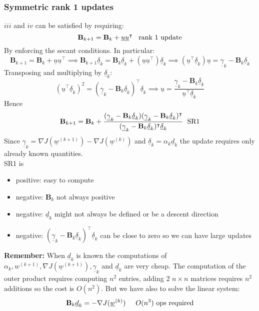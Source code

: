 \subsubsection{Symmetric rank 1 updates}
$iii$ and $iv$ can be satisfied by requiring:
\[
    \mathbf{B}_{k+1} = \mathbf{B}_k + \underline{u}\underline{u}^\intercal \hspace{0.3cm} \text{rank 1 update}   
\]
By enforcing the secant conditions. In particular:
\[
    \mathbf{B}_{k+1} = \mathbf{B}_k + \underline{u}\underline{u}^\intercal \implies \mathbf{B}_{k+1} \underline{\delta}_k = \mathbf{B}_k \underline{\delta}_k + (\underline{u}\underline{u}^\intercal) \underline{\delta}_k \implies (\underline{u}^\intercal \underline{\delta}_k)\underline{u} = \underline{\gamma}_k - \mathbf{B}_k \underline{\delta}_k
\]
Transposing and multiplying by $\underline{\delta}_k$:
\[
    (\underline{u}^\intercal \underline{\delta}_k)^2 = (\underline{\gamma}_k - \mathbf{B}_k\underline{\delta}_k)^\intercal \underline{\delta}_k \implies \underline{u} = \frac{\underline{\gamma}_k - \mathbf{B}_k\underline{\delta}_k}{\underline{u}^\intercal \underline{\delta}_k}    
\]
Hence
\[
    \mathbf{B}_{k+1} = \mathbf{B}_k + \frac{(\underline{\gamma}_k - \mathbf{B}_k\underline{\delta}_k)(\underline{\gamma}_k - \mathbf{B}_k\underline{\delta}_k)^\intercal}{(\underline{\gamma}_k - \mathbf{B}_k\underline{\delta}_k)^\intercal \underline{\delta}_k}    \hspace{0.2cm} \text{SR1}
\]
Since $\underline{\gamma}_k = \nabla J (\underline{w}^{(k+1)}) - \nabla J (\underline{w}^{(k)})$ and $\underline{\delta}_k = \alpha_k \underline{d}_k$ the update requires only already known quantities.\\

SR1 is 
\begin{itemize}
    \item positive: easy to compute
    \item negative: $\mathbf{B}_k$ not always positive
    \item negative: $\underline{d}_k$ might not always be defined or be a descent direction
    \item negative: $(\underline{\gamma}_k - \mathbf{B}_k\underline{\delta}_k)^\intercal\underline{\delta}_k$ can be close to zero so we can have large updates
\end{itemize}

\textbf{Remember: } When $\underline{d}_k$ is known the computations of $\alpha_k, w^{(k+1)},\nabla J(\underline{w}^{(k+1)}), \underline{\gamma}_k$ and $\underline{d}_k$ are very cheap. The computation of the outer product requires computing $n^2$ entries, adding 2 $n\times n$ matrices requires $n^2$ additions so the cost is $O(n^2)$. But we have also to solve the linear system:
\[
    \mathbf{B}_k\underline{d}_k = - \nabla J(\underline{w}^{(k)})\hspace{0.5cm} O(n^3)\text{ ops required}    
\]


